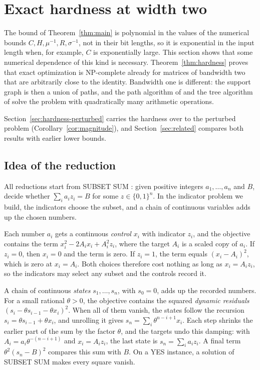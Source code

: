 \section{Exact hardness at width two}\label{sec:hardness}
The bound of Theorem~\ref{thm:main} is polynomial in the values of the
numerical bounds $C,H,\mu^{-1},R,\sigma^{-1}$, not in their bit lengths,
so it is exponential in the input length when, for example, $C$ is
exponentially large. This section shows that some numerical dependence
of this kind is necessary. Theorem~\ref{thm:hardness} proves that exact
optimization is NP-complete already for matrices of bandwidth two that
are arbitrarily close to the identity. Bandwidth one is different: the
support graph is then a union of paths, and the path algorithm of
\cite{LiuPath} and the tree algorithm of \cite{BhathenaTrees} solve the
problem with quadratically many arithmetic operations.

Section~\ref{sec:hardness-perturbed} carries the hardness over to the
perturbed problem (Corollary~\ref{cor:magnitude}), and
Section~\ref{sec:related} compares both results with earlier lower
bounds.

\subsection{Idea of the reduction}\label{sec:hardness-idea}
All reductions start from SUBSET SUM \cite{Karp}: given positive
integers $a_1,\ldots,a_n$ and $B$, decide whether $\sum_ia_iz_i=B$ for
some $z\in\{0,1\}^n$. In the indicator problem we build, the indicators
choose the subset, and a chain of continuous variables adds up the
chosen numbers.

Each number $a_i$ gets a continuous \emph{control} $x_i$ with indicator
$z_i$, and the objective contains the term $x_i^2-2A_ix_i+A_i^2z_i$,
where the target $A_i$ is a scaled copy of $a_i$. If $z_i=0$, then
$x_i=0$ and the term is zero. If $z_i=1$, the term equals
$(x_i-A_i)^2$, which is zero at $x_i=A_i$. Both choices therefore cost
nothing as long as $x_i=A_iz_i$, so the indicators may select any
subset and the controls record it.

A chain of continuous \emph{states} $s_1,\ldots,s_n$, with $s_0=0$,
adds up the recorded numbers. For a small rational $\theta>0$, the
objective contains the squared \emph{dynamic residuals}
$(s_i-\theta s_{i-1}-\theta x_i)^2$. When all of them vanish, the states
follow the recursion $s_i=\theta s_{i-1}+\theta x_i$, and unrolling it
gives $s_n=\sum_i\theta^{n-i+1}x_i$. Each step shrinks the earlier part
of the sum by the factor $\theta$, and the targets undo this damping:
with $A_i=a_i\theta^{-(n-i+1)}$ and $x_i=A_iz_i$, the last state is
$s_n=\sum_ia_iz_i$. A final term $\theta^2(s_n-B)^2$ compares this sum
with $B$. On a YES instance, a solution of SUBSET SUM makes every square
vanish.

